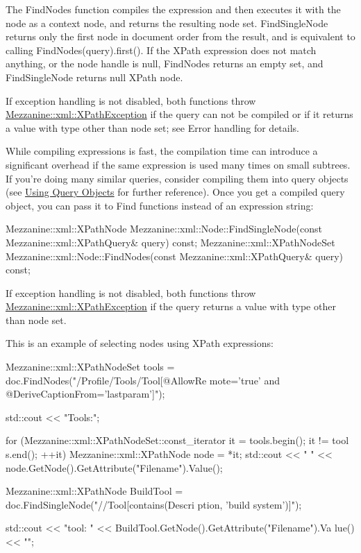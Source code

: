  The FindNodes function compiles the expression and then executes it with the node as a context node, and returns the resulting node set. FindSingleNode returns only the first node in document order from the result, and is equivalent to calling FindNodes(query).first(). If the XPath expression does not match anything, or the node handle is null, FindNodes returns an empty set, and FindSingleNode returns null XPath node. \par
 \par
 If exception handling is not disabled, both functions throw \hyperlink{classMezzanine_1_1xml_1_1XPathException}{Mezzanine::xml::XPathException} if the query can not be compiled or if it returns a value with type other than node set; see Error handling for details. \par
 \par
 While compiling expressions is fast, the compilation time can introduce a significant overhead if the same expression is used many times on small subtrees. If you're doing many similar queries, consider compiling them into query objects (see \hyperlink{XMLManual_XMLXPathQuery}{Using Query Objects} for further reference). Once you get a compiled query object, you can pass it to Find functions instead of an expression string: 
\begin{DoxyCode}
 Mezzanine::xml::XPathNode Mezzanine::xml::Node::FindSingleNode(const 
      Mezzanine::xml::XPathQuery& query) const;
 Mezzanine::xml::XPathNodeSet Mezzanine::xml::Node::FindNodes(const 
      Mezzanine::xml::XPathQuery& query) const;
\end{DoxyCode}
 If exception handling is not disabled, both functions throw \hyperlink{classMezzanine_1_1xml_1_1XPathException}{Mezzanine::xml::XPathException} if the query returns a value with type other than node set. \par
 \par
 This is an example of selecting nodes using XPath expressions: 
\begin{DoxyCode}
 Mezzanine::xml::XPathNodeSet tools = doc.FindNodes("/Profile/Tools/Tool[@AllowRe
      mote='true' and @DeriveCaptionFrom='lastparam']");

 std::cout << "Tools:";

 for (Mezzanine::xml::XPathNodeSet::const_iterator it = tools.begin(); it != tool
      s.end(); ++it)
 {
     Mezzanine::xml::XPathNode node = *it;
     std::cout << " " << node.GetNode().GetAttribute("Filename").Value();
 }

 Mezzanine::xml::XPathNode BuildTool = doc.FindSingleNode("//Tool[contains(Descri
      ption, 'build system')]");

 std::cout << "\nBuild tool: " << BuildTool.GetNode().GetAttribute("Filename").Va
      lue() << "\n";
\end{DoxyCode}
